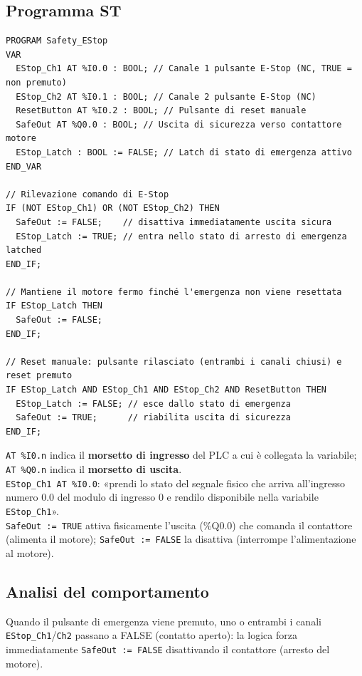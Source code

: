 \subsection{Programma ST}
\begin{lstlisting}[basicstyle=\ttfamily\small]
PROGRAM Safety_EStop
VAR
  EStop_Ch1 AT %I0.0 : BOOL; // Canale 1 pulsante E-Stop (NC, TRUE = non premuto)
  EStop_Ch2 AT %I0.1 : BOOL; // Canale 2 pulsante E-Stop (NC)
  ResetButton AT %I0.2 : BOOL; // Pulsante di reset manuale
  SafeOut AT %Q0.0 : BOOL; // Uscita di sicurezza verso contattore motore
  EStop_Latch : BOOL := FALSE; // Latch di stato di emergenza attivo
END_VAR

// Rilevazione comando di E-Stop
IF (NOT EStop_Ch1) OR (NOT EStop_Ch2) THEN
  SafeOut := FALSE;    // disattiva immediatamente uscita sicura
  EStop_Latch := TRUE; // entra nello stato di arresto di emergenza latched
END_IF;

// Mantiene il motore fermo finché l'emergenza non viene resettata
IF EStop_Latch THEN
  SafeOut := FALSE;
END_IF;

// Reset manuale: pulsante rilasciato (entrambi i canali chiusi) e reset premuto
IF EStop_Latch AND EStop_Ch1 AND EStop_Ch2 AND ResetButton THEN
  EStop_Latch := FALSE; // esce dallo stato di emergenza
  SafeOut := TRUE;      // riabilita uscita di sicurezza
END_IF;
\end{lstlisting}

\begin{note}
\texttt{AT \%I0.n} indica il \textbf{morsetto di ingresso} del PLC a cui è collegata la variabile; \texttt{AT \%Q0.n} indica il \textbf{morsetto di uscita}.\\
\texttt{EStop\_Ch1 AT \%I0.0}: «prendi lo stato del segnale fisico che arriva all'ingresso numero 0.0 del modulo di ingresso 0 e rendilo disponibile nella variabile \texttt{EStop\_Ch1}».\\
\texttt{SafeOut := TRUE} attiva fisicamente l'uscita (\%Q0.0) che comanda il contattore (alimenta il motore); \texttt{SafeOut := FALSE} la disattiva (interrompe l'alimentazione al motore).
\end{note}

\subsection{Analisi del comportamento}
Quando il pulsante di emergenza viene premuto, uno o entrambi i canali \texttt{EStop\_Ch1}/\texttt{Ch2} passano a FALSE (contatto aperto): la logica forza immediatamente \texttt{SafeOut := FALSE} disattivando il contattore (arresto del motore).

